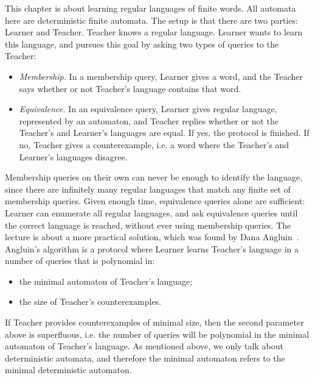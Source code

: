 This chapter is about learning regular languages of finite words. All automata here are deterministic finite automata. The setup is that there are two parties: Learner and Teacher. Teacher knows a regular language. Learner wants to learn this language, and pursues this goal by asking two types of queries to the Teacher:

\begin{itemize}
	\item \emph{Membership.} In a membership query, Learner gives a word, and the Teacher says whether or not Teacher's language contains that word.
\item  \emph{Equivalence.} In an equivalence query, Learner gives regular language, represented by an automaton, and Teacher replies whether or not the Teacher's and Learner's languages are equal. If yes, the protocol is finished. If no, Teacher gives a counterexample, i.e. a word where the Teacher's and Learner's languages disagree.
\end{itemize}

Membership queries on their own can never be enough to identify the language, since there are infinitely many regular languages that match any finite set of membership queries.  Given enough time, equivalence queries alone are sufficient:  Learner can enumerate all regular languages, and ask equivalence queries until the correct language is reached, without ever using membership queries. The lecture is about a more practical solution, which was found by Dana Angluin~\cite{Angluin:1987kr}. Angluin's algorithm is a protocol where Learner learns Teacher's language in a number of queries that is polynomial in:
\begin{itemize}
	\item the minimal automaton of Teacher's language;
\item the size of Teacher's counterexamples.
\end{itemize}
If Teacher provides counterexamples of minimal size, then the second parameter above is superfluous, i.e. the number of queries will be polynomial in the minimal automaton of Teacher's language. As mentioned above, we only talk about deterministic automata, and therefore the minimal automaton refers to the minimal deterministic automaton.





